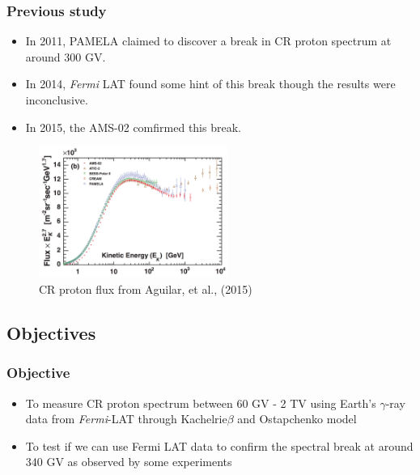 \documentclass{beamer}
\begin{document}
\begin{frame}
\frametitle{Previous study}
\begin{itemize}
  \item In 2011, PAMELA claimed to discover a break in CR proton spectrum at around 300 GV.
  \item In 2014, \textit{Fermi} LAT found some hint of this break though the results were inconclusive.
  \item In 2015, the AMS-02 comfirmed this break.
\end{itemize}
\begin{figure}
  \includegraphics[width=0.55\textwidth]{proton_spectrum}
  \caption{CR proton flux from Aguilar, et al., (2015)}
\end{figure}
\end{frame}

\subsection{Objectives}

\begin{frame}
\frametitle{Objective}
\begin{itemize}
  \item To measure CR proton spectrum between 60 GV - 2 TV using
  Earth's $\gamma$-ray data from \textit{Fermi}-LAT through Kachelrie$\beta$ and Ostapchenko model
  \item To test if we can use Fermi LAT data to confirm the spectral break at around 340 GV as observed by some experiments
\end{itemize}
\end{frame}
\end{document}
